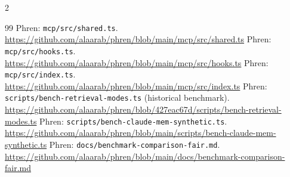 \documentclass[10pt]{article}
\begin{document}
\begin{multicols}{2}
\begin{thebibliography}{99}
 Phren: \texttt{mcp/src/shared.ts}. \url{https://github.com/alaarab/phren/blob/main/mcp/src/shared.ts}
 Phren: \texttt{mcp/src/hooks.ts}. \url{https://github.com/alaarab/phren/blob/main/mcp/src/hooks.ts}
 Phren: \texttt{mcp/src/index.ts}. \url{https://github.com/alaarab/phren/blob/main/mcp/src/index.ts}
 Phren: \texttt{scripts/bench-retrieval-modes.ts} (historical benchmark). \url{https://github.com/alaarab/phren/blob/427eac67d/scripts/bench-retrieval-modes.ts}
 Phren: \texttt{scripts/bench-claude-mem-synthetic.ts}. \url{https://github.com/alaarab/phren/blob/main/scripts/bench-claude-mem-synthetic.ts}
 Phren: \texttt{docs/benchmark-comparison-fair.md}. \url{https://github.com/alaarab/phren/blob/main/docs/benchmark-comparison-fair.md}
\end{thebibliography}
\end{multicols}
\end{document}
